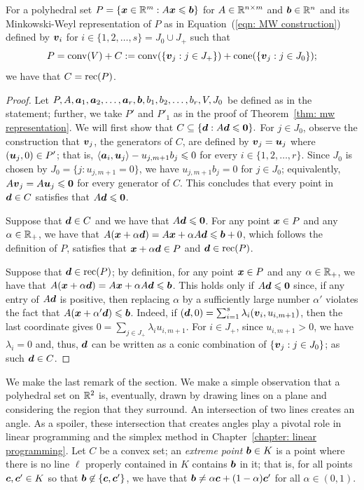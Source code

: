 \begin{corollary}\label{cor: C is recession}
For a polyhedral set $P = \{{\boldsymbol x}\in \mathbb R^m: A{\boldsymbol x}\leqslant {\boldsymbol b}\}$ for $A\in\mathbb R^{n\times m}$ and ${\boldsymbol b}\in\mathbb R^n$ and its Minkowski-Weyl representation of $P$ as in Equation~(\ref{eqn: MW construction}) defined by ${\boldsymbol v}_i$ for $i\in \{1, 2, \dots, s\} = J_0 \cup J_+$ such that 
\[ P = \operatorname{conv}(V) + C := \operatorname{conv}(\{{\boldsymbol v}_j: j\in J_+\}) + \operatorname{cone}(\{{\boldsymbol v}_j: j\in J_0\}); \] we have that $C = \operatorname{rec}(P)$.
\end{corollary}
\begin{proof}
Let $P, A, {\boldsymbol a}_1, {\boldsymbol a}_2, \dots, {\boldsymbol a}_r, {\boldsymbol b}, b_1, b_2, \dots, b_r, V, J_0$ be defined as in the statement; further, we take $P'$ and $P'_1$ as in the proof of Theorem~\ref{thm: mw representation}. We will first show that $C \subseteq \{{\boldsymbol d} : A{\boldsymbol d} \leqslant \boldsymbol0 \}.$ For $j\in J_0$, observe the construction that ${\boldsymbol v}_j$, the generators of $C$, are defined by ${\boldsymbol v}_j = {\boldsymbol u}_j$ where $({\boldsymbol u}_j, 0)\in P'$; that is, $\left\langle{\boldsymbol a}_i, {\boldsymbol u}_j\right\rangle - u_{j, m+1} b_j \leqslant 0$ for every $i\in\{1, 2, \dots, r\}$. Since $J_0$ is chosen by $J_0 = \{j: u_{j, m+1} = 0\}$, we have $u_{j, m+1} b_j = 0$ for $j\in J_0$; equivalently, $A{\boldsymbol v}_j = A{\boldsymbol u}_j \leqslant \boldsymbol0$ for every generator of $C$. This concludes that every point in ${\boldsymbol d}\in C$ satisfies that $A{\boldsymbol d}\leqslant\boldsymbol0$. 

Suppose that ${\boldsymbol d}\in C$ and we have that $A {\boldsymbol d} \leqslant \boldsymbol0$. For any point ${\boldsymbol x}\in P$ and any $\alpha\in\mathbb R_+$, we have that $A({\boldsymbol x} + \alpha{\boldsymbol d}) = A{\boldsymbol x} + \alpha A {\boldsymbol d} \leqslant {\boldsymbol b} + 0$, which follows the definition of $P$, satisfies that ${\boldsymbol x} + \alpha {\boldsymbol d} \in P$ and ${\boldsymbol d}\in \operatorname{rec}(P)$. 

Suppose that ${\boldsymbol d} \in \operatorname{rec}(P)$; by definition, for any point ${\boldsymbol x}\in P$ and any $\alpha\in\mathbb R_+$, we have that $A({\boldsymbol x} + \alpha {\boldsymbol d}) = A{\boldsymbol x} + \alpha A{\boldsymbol d} \leqslant {\boldsymbol b}$. This holds only if $A {\boldsymbol d} \leqslant \boldsymbol0$ since, if any entry of $A{\boldsymbol d}$ is positive, then replacing $\alpha$ by a sufficiently large number $\alpha'$ violates the fact that  $A({\boldsymbol x} + \alpha' {\boldsymbol d} ) \leqslant {\boldsymbol b}$. Indeed, if $({\boldsymbol d}, 0) = \sum_{i=1}^s \lambda_i ({\boldsymbol v}_i, u_{i,m+1})$, then the last coordinate gives $0 = \sum_{j \in J_+}\lambda_i u_{i, m+1}.$ For $i\in J_+$, since $u_{i, m+1} > 0$, we have $\lambda_i = 0$ and, thus, ${\boldsymbol d}$ can be written as a conic combination of $\{{\boldsymbol v}_j: j\in J_0\}$; as such ${\boldsymbol d}\in C$. 
\end{proof}

We make the last remark of the section. We make a simple observation that a polyhedral set on $\mathbb R^2$ is, eventually, drawn by drawing lines on a plane and considering the region that they surround. An intersection of two lines creates an angle. As a spoiler, these intersection that creates angles play a pivotal role in linear programming and the simplex method in Chapter~\ref{chapter: linear programming}. Let $C$ be a convex set; an {\em extreme point} ${\boldsymbol b}\in K$ is a point where there is no line $\ell$ properly contained in $K$ contains ${\boldsymbol b}$ in it; that is, for all points ${\boldsymbol c}, {\boldsymbol c}'\in K$ so that ${\boldsymbol b}\not\in \{{\boldsymbol c}, {\boldsymbol c}'\}$, we have that $ {\boldsymbol b} \neq \alpha{\boldsymbol c} + (1 - \alpha) {\boldsymbol c}'$ for all $ \alpha\in(0,1)$.  

